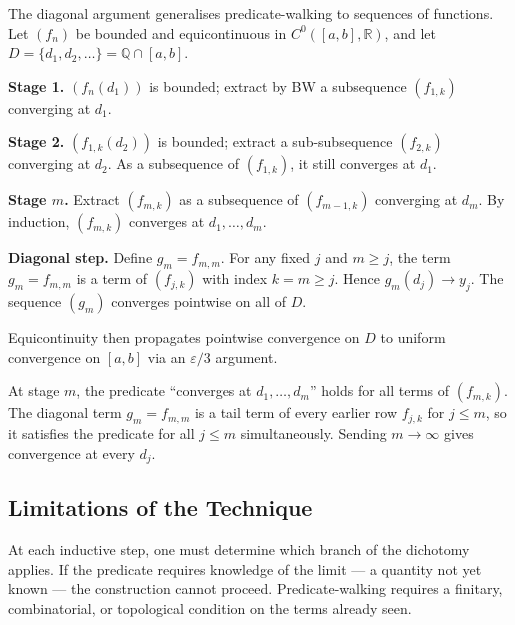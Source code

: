\begin{remark}
\label{rem:arzela-ascoli}
The diagonal argument generalises predicate-walking to sequences of
functions. Let $(f_n)$ be bounded and equicontinuous in
$C^0([a,b],\mathbb{R})$, and let $D=\{d_1,d_2,\ldots\}=\mathbb{Q}\cap[a,b]$.

\medskip
\noindent\textbf{Stage 1.} $(f_n(d_1))$ is bounded; extract by BW a
subsequence $(f_{1,k})$ converging at $d_1$.

\noindent\textbf{Stage 2.} $(f_{1,k}(d_2))$ is bounded; extract a
sub-subsequence $(f_{2,k})$ converging at $d_2$. As a subsequence of
$(f_{1,k})$, it still converges at $d_1$.

\noindent\textbf{Stage $m$.} Extract $(f_{m,k})$ as a subsequence of
$(f_{m-1,k})$ converging at $d_m$. By induction, $(f_{m,k})$ converges
at $d_1,\ldots,d_m$.

\noindent\textbf{Diagonal step.} Define $g_m=f_{m,m}$. For any fixed $j$
and $m\geq j$, the term $g_m=f_{m,m}$ is a term of $(f_{j,k})$ with
index $k=m\geq j$. Hence $g_m(d_j)\to y_j$. The sequence $(g_m)$
converges pointwise on all of $D$.

\medskip
Equicontinuity then propagates pointwise convergence on $D$ to uniform
convergence on $[a,b]$ via an $\varepsilon/3$ argument.
\end{remark}

\begin{remark}
At stage $m$, the predicate ``converges at $d_1,\ldots,d_m$'' holds for
all terms of $(f_{m,k})$. The diagonal term $g_m=f_{m,m}$ is a tail term
of every earlier row $f_{j,k}$ for $j\leq m$, so it satisfies the
predicate for all $j\leq m$ simultaneously. Sending $m\to\infty$ gives
convergence at every $d_j$.
\end{remark}



\subsection*{Limitations of the Technique}
\label{subsec:predicate-limitations}

\begin{remark}
At each inductive step, one must determine which branch of the dichotomy
applies. If the predicate requires knowledge of the limit --- a quantity not
yet known --- the construction cannot proceed. Predicate-walking requires a
finitary, combinatorial, or topological condition on the terms already seen.
\end{remark}


